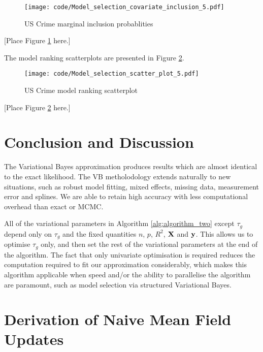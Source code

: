 \documentclass{amsart}[12pt]
\begin{document}
\begin{figure}[p]
	\texttt{[image: code/Model\_selection\_covariate\_inclusion\_5.pdf]}
	\caption{US Crime marginal inclusion probablities}
	\label{fig:USCrime_inclusion}
\end{figure}

[Place Figure \ref{fig:USCrime_inclusion} here.]

The model ranking scatterplots are presented in Figure \ref{fig:USCrime_model_ranking}.

\begin{figure}[p]
	\texttt{[image: code/Model\_selection\_scatter\_plot\_5.pdf]}
	\caption{US Crime model ranking scatterplot}
	\label{fig:USCrime_model_ranking}
\end{figure}

[Place Figure \ref{fig:USCrime_model_ranking} here.]

\section{Conclusion and Discussion}
\label{sec:conclusion}

The Variational Bayes approximation produces results which are almost identical to the exact likelihood.
The VB metholodology extends naturally to new situations, such as robust model fitting, mixed effects, missing
data, measurement error and splines. We are able to retain high accuracy with less computational overhead than
exact or MCMC.

All of the variational parameters in Algorithm \ref{alg:algorithm_two} except $\tau_g$ depend only on
$\tau_g$ and the fixed quantities $n$, $p$, $R^2$, ${\bf X}$ and ${\bf y}$. This allows us to optimise $\tau_g$
only, and then set the rest of the variational parameters at the end of the algorithm. The fact that only
univariate optimisation is required reduces the computation required to fit our approximation considerably,
which makes this algorithm applicable when speed and/or the ability to parallelise the algorithm are
paramount, such as model selection via structured Variational Bayes.




\appendix
\section{Derivation of Naive Mean Field Updates}
\label{sec:appendix}
\end{document}
